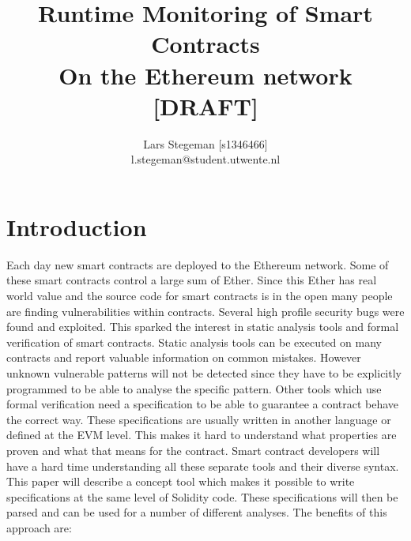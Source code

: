 \documentclass[a4paper]{article}
\title{Runtime Monitoring of Smart Contracts \\
\large On the Ethereum network [DRAFT] \\}
\author{Lars Stegeman [s1346466]\\ l.stegeman@student.utwente.nl}
\begin{document}
\maketitle

\tableofcontents


\section{Introduction}
Each day new smart contracts are deployed to the Ethereum network. Some of these smart contracts control a large sum of Ether. Since this Ether has real world value and the source code for smart contracts is in the open many people are finding vulnerabilities within contracts. Several high profile security bugs were found and exploited. This sparked the interest in static analysis tools and formal verification of smart contracts. Static analysis tools can be executed on many contracts and report valuable information on common mistakes. However unknown vulnerable patterns will not be detected since they have to be explicitly programmed to be able to analyse the specific pattern. Other tools which use formal verification need a specification to be able to guarantee a contract behave the correct way. These specifications are usually written in another language or defined at the EVM level. This makes it hard to understand what properties are proven and what that means for the contract. Smart contract developers will have a hard time understanding all these separate tools and their diverse syntax. This paper will describe a concept tool which makes it possible to write specifications at the same level of Solidity code. These specifications will then be parsed and can be used for a number of different analyses. The benefits of this approach are:
\end{document}
